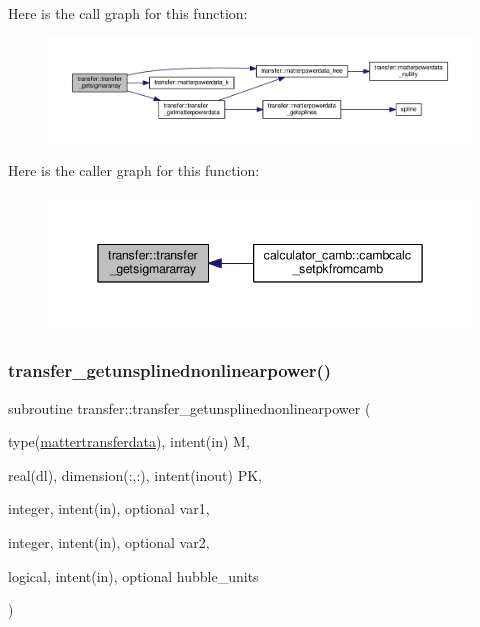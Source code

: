 Here is the call graph for this function\+:
\nopagebreak
\begin{figure}[H]
\begin{center}
\leavevmode
\includegraphics[width=350pt]{namespacetransfer_a9f16a04226ffcb97b7f2bfc5b681f3b4_cgraph}
\end{center}
\end{figure}
Here is the caller graph for this function\+:
\nopagebreak
\begin{figure}[H]
\begin{center}
\leavevmode
\includegraphics[width=342pt]{namespacetransfer_a9f16a04226ffcb97b7f2bfc5b681f3b4_icgraph}
\end{center}
\end{figure}
\mbox{\label{namespacetransfer_a8690f3749fa31715c7729f1f934b7d91}} 
\subsubsection{\texorpdfstring{transfer\+\_\+getunsplinednonlinearpower()}{transfer\_getunsplinednonlinearpower()}}
{\footnotesize\ttfamily subroutine transfer\+::transfer\+\_\+getunsplinednonlinearpower (\begin{DoxyParamCaption}\item[{type(\mbox{\hyperlink{structtransfer_1_1mattertransferdata}{mattertransferdata}}), intent(in)}]{M,  }\item[{real(dl), dimension(\+:,\+:), intent(inout)}]{PK,  }\item[{integer, intent(in), optional}]{var1,  }\item[{integer, intent(in), optional}]{var2,  }\item[{logical, intent(in), optional}]{hubble\+\_\+units }\end{DoxyParamCaption})}



